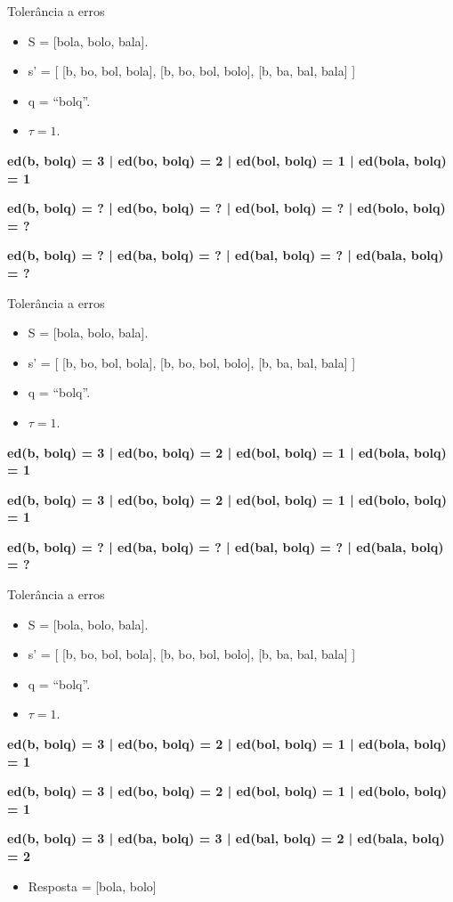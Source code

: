 \documentclass[11pt]{beamer}
\begin{document}
\begin{frame}{Tolerância a erros}
	\begin{itemize}
		\item S = [bola, bolo, bala]. 
		\item s’ = [ [b, bo, bol, bola], [b, bo, bol, bolo], [b, ba, bal, bala] ]
		\item q = ``bolq''.
		\item $\tau = 1$.
	\end{itemize}
	
	\textbf{ed(b, bolq) = 3 | ed(bo, bolq) = 2 | ed(bol, bolq) = 1 | ed(bola, bolq) = 1}
	
    \textbf{ed(b, bolq) = ? | ed(bo, bolq) = ? | ed(bol, bolq) = ? | ed(bolo, bolq) = ?}
    
    \textbf{ed(b, bolq) = ? | ed(ba, bolq) = ? | ed(bal, bolq) = ? | ed(bala, bolq) = ?}
\end{frame}

\begin{frame}{Tolerância a erros}
	\begin{itemize}
		\item S = [bola, bolo, bala]. 
		\item s’ = [ [b, bo, bol, bola], [b, bo, bol, bolo], [b, ba, bal, bala] ]
		\item q = ``bolq''.
		\item $\tau = 1$.
	\end{itemize}
	
	\textbf{ed(b, bolq) = 3 | ed(bo, bolq) = 2 | ed(bol, bolq) = 1 | ed(bola, bolq) = 1}
	
    \textbf{ed(b, bolq) = 3 | ed(bo, bolq) = 2 | ed(bol, bolq) = 1 | ed(bolo, bolq) = 1}
    
    \textbf{ed(b, bolq) = ? | ed(ba, bolq) = ? | ed(bal, bolq) = ? | ed(bala, bolq) = ?}
\end{frame}

\begin{frame}{Tolerância a erros}
	\begin{itemize}
		\item S = [bola, bolo, bala]. 
		\item s’ = [ [b, bo, bol, bola], [b, bo, bol, bolo], [b, ba, bal, bala] ]
		\item q = ``bolq''.
		\item $\tau = 1$.
	\end{itemize}
	
	\textbf{ed(b, bolq) = 3 | ed(bo, bolq) = 2 | ed(bol, bolq) = 1 | ed(bola, bolq) = 1}
	
    \textbf{ed(b, bolq) = 3 | ed(bo, bolq) = 2 | ed(bol, bolq) = 1 | ed(bolo, bolq) = 1}
    
    \textbf{ed(b, bolq) = 3 | ed(ba, bolq) = 3 | ed(bal, bolq) = 2 | ed(bala, bolq) = 2}
    
    \pause
    \begin{itemize}
        \item Resposta = [bola, bolo]
    \end{itemize}
\end{frame}
\end{document}
